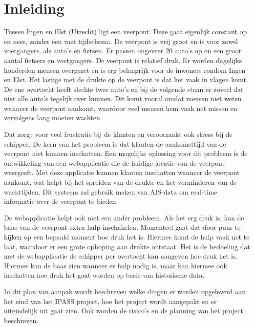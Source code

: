 \documentclass{article}
\begin{document}
\section{Inleiding}
Tussen Ingen en Elst (Utrecht) ligt een veerpont. Deze gaat eigenlijk constant op en neer, zonder een vast tijdschema.
De veerpont is vrij groot en is voor zowel voetgangers, als auto's en fietsen. Er passen ongeveer 20 auto's op en een groot aantal fietsers en voetgangers.
De veerpont is relatief druk. Er worden dagelijks honderden mensen overgezet en is erg belangrijk voor de inwoners rondom Ingen en Elst. Het lastige met de drukte op de veerpont is dat het vaak in vlagen komt. De ene overtocht heeft slechts twee auto's en bij de volgende staan er zoveel dat niet alle auto's tegelijk over kunnen. Dit komt vooral omdat mensen niet weten wanneer de veerpont aankomt, waardoor veel mensen hem vaak net missen en vervolgens lang moeten wachten.
\par\smallskip 
Dat zorgt voor veel frustratie bij de klanten en veroorzaakt ook stress bij de schipper.
De kern van het probleem is dat klanten de aankomsttijd van de veerpont niet kunnen inschatten.
Een mogelijke oplossing voor dit probleem is de ontwikkeling van een webapplicatie die de huidige locatie van de veerpont weergeeft. Met deze applicatie kunnen klanten inschatten wanneer de veerpont aankomt, wat helpt bij het spreiden van de drukte en het verminderen van de wachttijden. Dit systeem zal gebruik maken van AIS-data om real-time informatie over de veerpont te bieden.
\par\smallskip 
De webapplicatie helpt ook met een ander probleem. Als het erg druk is, kan de baas van de veerpont extra hulp inschakelen. Momenteel gaat dat door puur te kijken op een bepaald moment hoe druk het is. 
Hiermee komt de hulp vaak net te laat, waardoor er een grote ophoping aan drukte ontstaat. Het is de bedoeling dat met de webapplicatie de schipper per overtocht kan aangeven hoe druk het is. Hiermee kan de baas zien wanneer er hulp nodig is, maar kan hiermee ook inschatten hoe druk het gaat worden op basis van historische data. 
\par\smallskip 
In dit plan van aanpak wordt beschreven welke dingen er worden opgeleverd aan het eind van het IPASS project, hoe het project wordt aangepakt en er uiteindelijk uit gaat zien.
Ook worden de risico's en de planning van het project beschreven.
\end{document}
